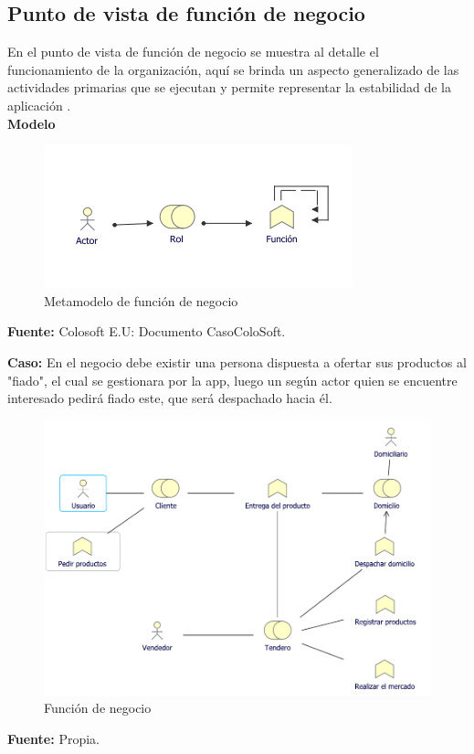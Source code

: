 	\subsection{Punto de vista de función de negocio}
	{ En el punto de vista de función de negocio se muestra al detalle el funcionamiento de la organización, aquí se brinda un aspecto generalizado de las actividades primarias que se ejecutan y permite representar la estabilidad de la aplicación \cite{archimate}.\\
		
		\textbf{Modelo}\\
		\begin{figure}[H]
			\centering
			\includegraphics[width=0.6\linewidth]{development/funcion.png}
			\caption{Metamodelo de función de negocio}
		\end{figure}
		\begin{center}
			\textbf{Fuente:} Colosoft E.U: Documento CasoColoSoft.
		\end{center}
		
		\textbf{Caso:} En el negocio debe existir una persona dispuesta a ofertar sus productos al "fiado", el cual se gestionara por la app, luego un según actor quien se encuentre interesado pedirá fiado este, que será despachado hacia él.
		
		\begin{figure}[H]
			\centering
			\includegraphics[width=0.8\linewidth]{development/funcion.pdf}
			\caption{Función de negocio}
		\end{figure}
		\begin{center}
			\textbf{Fuente:} Propia.
		\end{center}
	}
	
